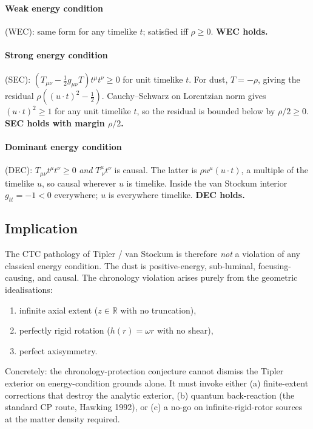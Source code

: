 \documentclass[11pt,a4paper]{article}
\begin{document}
\paragraph{Weak energy condition} (WEC): same form for any timelike
$t$; satisfied iff $\rho \ge 0$. \textbf{WEC holds.}

\paragraph{Strong energy condition} (SEC):
$(T_{\mu\nu} - \tfrac{1}{2} g_{\mu\nu} T) t^\mu t^\nu \ge 0$ for unit
timelike $t$. For dust, $T = -\rho$, giving the residual
$\rho ((u\cdot t)^2 - \tfrac{1}{2})$. Cauchy--Schwarz on Lorentzian
norm gives $(u\cdot t)^2 \ge 1$ for any unit timelike $t$, so the
residual is bounded below by $\rho/2 \ge 0$. \textbf{SEC holds with
margin $\rho/2$.}

\paragraph{Dominant energy condition} (DEC): $T_{\mu\nu} t^\mu t^\nu
\ge 0$ \emph{and} $T^\mu_{~\nu} t^\nu$ is causal. The latter is
$\rho u^\mu (u\cdot t)$, a multiple of the timelike $u$, so causal
wherever $u$ is timelike. Inside the van Stockum interior
$g_{tt} = -1 < 0$ everywhere; $u$ is everywhere timelike.
\textbf{DEC holds.}

\subsection{Implication}

The CTC pathology of Tipler / van Stockum is therefore \emph{not} a
violation of any classical energy condition. The dust is positive-energy,
sub-luminal, focusing-causing, and causal. The chronology violation
arises purely from the geometric idealisations:

\begin{enumerate}[leftmargin=*]
\item infinite axial extent ($z \in \mathbb{R}$ with no truncation),
\item perfectly rigid rotation ($h(r) = \omega r$ with no shear),
\item perfect axisymmetry.
\end{enumerate}

Concretely: the chronology-protection conjecture cannot dismiss the
Tipler exterior on energy-condition grounds alone. It must invoke
either (a) finite-extent corrections that destroy the analytic
exterior, (b) quantum back-reaction (the standard CP route, Hawking
1992), or (c) a no-go on infinite-rigid-rotor sources at the matter
density required.
\end{document}
